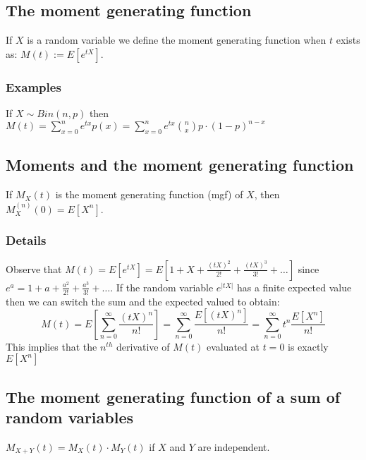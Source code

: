 \documentclass[12pt,a4paper]{article}
\theoremstyle{regla}
\theoremstyle{remark}
\theoremstyle{definition}
\theoremstyle{nonumberbreak}
\begin{document}
\subsection{The moment generating function}
\begin{fbox}
\begin{minipage}{0.97\textwidth}
If $X$ is a random variable we define the moment generating function when $t$ exists as: $M(t):=E[e^{tX}]$.
\end{minipage}
\end{fbox}
\subsubsection{Examples}
\begin{xmpl}
If $X\sim Bin(n,p)$ then $M(t)=\displaystyle\sum_{x=0}^{n} e^{tx}p(x) = \displaystyle\sum_{x=0}^{n} e^{tx} \binom{n}{x}p\cdot (1-p)^{n-x}$ 
\end{xmpl}

\subsection{Moments and the moment generating function}
\begin{fbox}
\begin{minipage}{0.97\textwidth}
If $M_{X}(t)$ is the moment generating function (mgf) of $X$, then $M_{X}^{(n)}(0)=E[X^n]$.
\end{minipage}
\end{fbox}
\subsubsection{Details}
Observe that $M(t)=E[e^{tX}]=E[1+X+\frac{(tX)^2}{2!}+\frac{(tX)^3}{3!}+\dots]$ since $e^a=1+a+\frac{a^2}{2!}+\frac{a^3}{3!}+\dots$. If the random variable $e^{|tX|}$ has a finite expected value then we can switch the sum and the expected valued to obtain:
$$M(t)=E[\sum_{n=0}^{\infty}\frac{(tX)^n}{n!}]=\sum_{n=0}^{\infty}\frac{E[(tX)^n]}{n!}=\sum_{n=0}^{\infty}t^n\frac{E[X^n]}{n!}$$
This implies that the $n^{th}$ derivative of $M(t)$ evaluated at $t=0$ is exactly $E[X^n]$

\subsection{The moment generating function of a sum of random variables}
\begin{fbox}
\begin{minipage}{0.97\textwidth}
$M_{X+Y}(t)=M_{X}(t)\cdot M_{Y}(t)$ if $X$ and $Y$ are independent.
\end{minipage}
\end{fbox}
\end{document}
